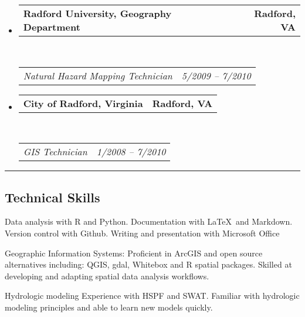 \documentclass[10pt,letterpaper]{article}
\makeatletter
\newenvironment{indentsection}[1]%
{\begin{list}{}%
		{\setlength{\leftmargin}{#1}}%
		\item[]%
	}
	{\end{list}}
\newcommand{\headerrow}[2]
{\begin{tabular*}{\linewidth}{l@{\extracolsep{\fill}}r}
		#1 &
		#2 \\
\end{tabular*}}
\makeatother
\begin{document}
\begin{itemize}
\begin{itemize*}
		\end{itemize*}
		
		\item
		\headerrow
		{\textbf{Radford University, Geography Department}}
		{\textbf{Radford, VA}}
		\\
		\headerrow
		{\emph{Natural Hazard Mapping Technician}}
		{\emph{5/2009 -- 7/2010}}
		
		\item
		\headerrow
		{\textbf{City of Radford, Virginia}}
		{\textbf{Radford, VA}}
		\\
		\headerrow
		{\emph{GIS Technician}}
		{\emph{1/2008 -- 7/2010}}
		
	\end{itemize}
	
	\hrule
	\vspace{-0.4em}
	\subsection*{Technical Skills}
	
	\begin{indentsection}{\parindent}
		\begin{description*}
			\item[]
			Data analysis with R and Python. Documentation with \LaTeX\ and Markdown. Version control with Github. Writing and presentation with Microsoft Office
			\item[Geographic Information Systems:]
			Proficient in ArcGIS and open source alternatives including: QGIS, gdal, Whitebox and R spatial packages. Skilled at developing and adapting spatial data analysis workflows.
			\item[Hydrologic modeling]
			Experience with HSPF and SWAT. Familiar with hydrologic modeling principles and able to learn new models quickly.
		\end{description*}
	\end{indentsection}
	
\end{document}

